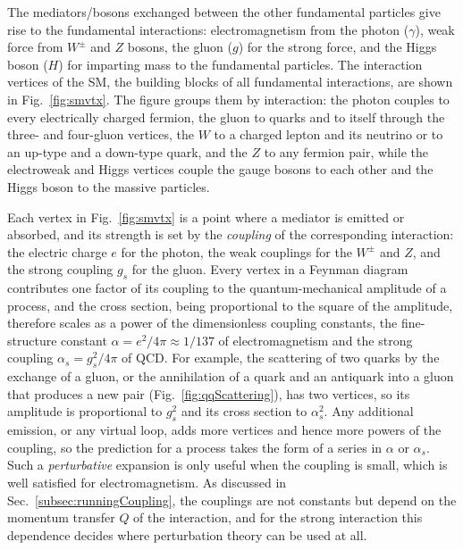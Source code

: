 The mediators/bosons exchanged between the other fundamental particles give rise to the fundamental interactions: electromagnetism from the photon (\(\gamma\)), weak force from \(W^\pm\) and \(Z\) bosons, the gluon (\(g\)) for the strong force, and the Higgs boson (\(H\)) for imparting mass to the fundamental particles. The interaction vertices of the SM, the building blocks of all fundamental interactions, are shown in Fig.~\ref{fig:smvtx}.
%
The figure groups them by interaction: the photon couples to every electrically charged fermion, the gluon to quarks and to itself through the three- and four-gluon vertices, the \(W\) to a charged lepton and its neutrino or to an up-type and a down-type quark, and the \(Z\) to any fermion pair, while the electroweak and Higgs vertices couple the gauge bosons to each other and the Higgs boson to the massive particles.

Each vertex in Fig.~\ref{fig:smvtx} is a point where a mediator is emitted or absorbed, and its strength is set by the \emph{coupling} of the corresponding interaction: the electric charge \(e\) for the photon, the weak couplings for the \(W^\pm\) and \(Z\), and the strong coupling \(g_s\) for the gluon.
%
Every vertex in a Feynman diagram contributes one factor of its coupling to the quantum-mechanical amplitude of a process, and the cross section, being proportional to the square of the amplitude, therefore scales as a power of the dimensionless coupling constants, the fine-structure constant \(\alpha = e^2/4\pi \approx 1/137\) of electromagnetism and the strong coupling \(\alpha_s = g_s^2/4\pi\) of QCD.
%
For example, the scattering of two quarks by the exchange of a gluon, or the annihilation of a quark and an antiquark into a gluon that produces a new pair (Fig.~\ref{fig:qqScattering}), has two vertices, so its amplitude is proportional to \(g_s^2\) and its cross section to \(\alpha_s^2\).
%
Any additional emission, or any virtual loop, adds more vertices and hence more powers of the coupling, so the prediction for a process takes the form of a series in \(\alpha\) or \(\alpha_s\).
%
Such a \emph{perturbative} expansion is only useful when the coupling is small, which is well satisfied for electromagnetism.
%
As discussed in Sec.~\ref{subsec:runningCoupling}, the couplings are not constants but depend on the momentum transfer \(Q\) of the interaction, and for the strong interaction this dependence decides where perturbation theory can be used at all.

